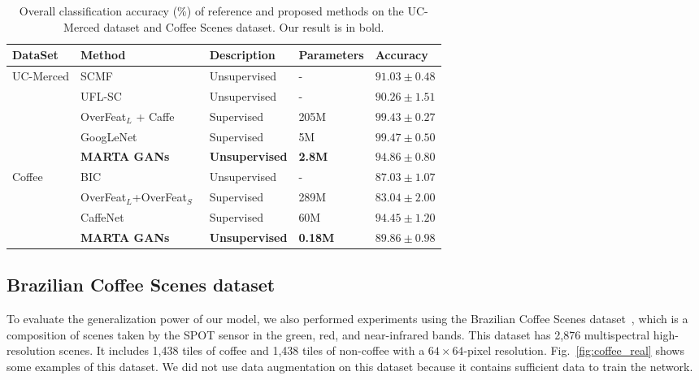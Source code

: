 \documentclass[journal]{IEEEtran}
\begin{document}
\begin{table}[t]
	\centering
	\scriptsize
	\caption{Overall classification accuracy (\%) of reference and proposed methods on the UC-Merced dataset and Coffee Scenes dataset. Our result is in bold.}
	\label{tab:uc_ref}
	
	\begin{tabular}{|p{1.2cm}<{\centering} | p{2.25cm} p{1.2cm} p{0.7cm}<{\centering}  p{1.4cm}<{\centering}|}
		\hline
		 DataSet&Method & Description&Parameters &Accuracy \\
		\hline
		 \multirow{5}{*}{UC-Merced}&SCMF~\cite{sheng2012high}& Unsupervised&- & $91.03\pm0.48$ \\
		&UFL-SC~\cite{hu2015unsupervised}&Unsupervised&-& $90.26\pm1.51$  \\
		&OverFeat$_L$ + Caffe~\cite{penatti2015deep}&Supervised&205M&$99.43\pm0.27$\\
		&GoogLeNet~\cite{nogueira2017towards}&Supervised&5M&$99.47\pm0.50$\\
		&\textbf{MARTA GANs}&\textbf{Unsupervised}&\textbf{2.8M}& \textbf{$94.86\pm0.80$}\\
		\hline
		 \multirow{4}{*}{Coffee}	&BIC~\cite{penatti2015deep}& Unsupervised&- & $87.03\pm1.07$ \\
	&OverFeat$_L$+OverFeat$_S$~\cite{penatti2015deep}&Supervised&289M& $83.04\pm2.00$  \\
		&CaffeNet~\cite{nogueira2017towards}&Supervised&60M& $94.45\pm1.20$  \\
		&\textbf{MARTA GANs}&\textbf{Unsupervised}&\textbf{0.18M}& \textbf{$89.86\pm0.98$}\\
		\hline
	\end{tabular}
\vspace{-1em}
\end{table}










\subsection{Brazilian Coffee Scenes dataset}
\label{subsect:coffee}
To evaluate the generalization power of our model, we also performed experiments using the Brazilian Coffee Scenes dataset~\cite{penatti2015deep}, which is a composition of scenes taken by the SPOT sensor in the green, red, and near-infrared bands. This dataset has 2,876 multispectral high-resolution scenes. It includes 1,438 tiles of coffee and 1,438 tiles of non-coffee with a $64\times64$-pixel resolution. Fig.~\ref{fig:coffee_real} shows some examples of this dataset. We did not use data augmentation on this dataset because it contains sufficient data to train the network.
\end{document}
